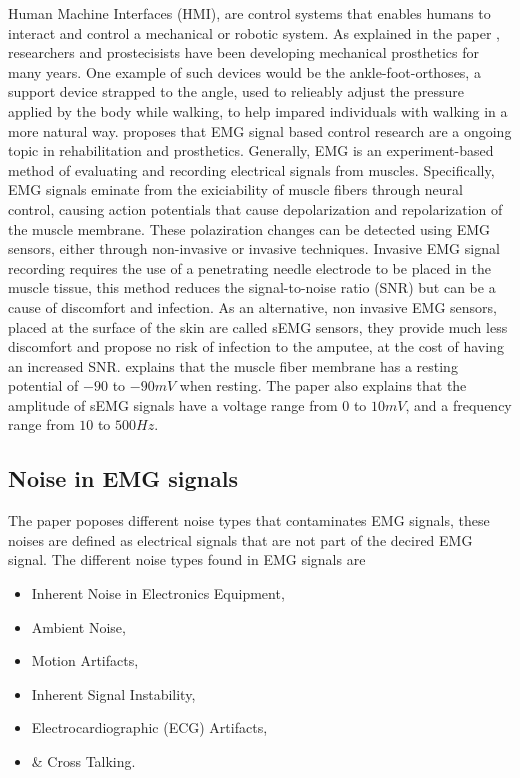 \documentclass[../main.tex]{subfiles}
\begin{document}
Human Machine Interfaces (HMI), are control systems that enables humans to interact and control a mechanical or robotic system.
As explained in the paper \cite{Tech2015}, researchers and prostecisists have been developing mechanical prosthetics for many years.
One example of such devices would be the ankle-foot-orthoses, a support device strapped to the angle, used to relieably adjust the pressure applied by the body while walking, to help impared individuals with walking in a more natural way.
\cite{Tech2015} proposes that EMG signal based control research are a ongoing topic in rehabilitation and prosthetics.
Generally, EMG is an experiment-based method of evaluating and recording electrical signals from muscles.
Specifically, EMG signals eminate from the exiciability of muscle fibers through neural control, causing action potentials that cause depolarization and repolarization of the muscle membrane.
These polaziration changes can be detected using EMG sensors, either through non-invasive or invasive techniques.
Invasive EMG signal recording requires the use of a penetrating needle electrode to be placed in the muscle tissue, this method reduces the signal-to-noise ratio (SNR) but can be a cause of discomfort and infection.
As an alternative, non invasive EMG sensors, placed at the surface of the skin are called sEMG sensors, they provide much less discomfort and propose no risk of infection to the amputee, at the cost of having an increased SNR. 
\cite{Tech2015} explains that the muscle fiber membrane has a resting potential of $-90$ to $-90 mV$ when resting. The paper also explains that the amplitude of sEMG signals have a voltage range from $0$ to $10 mV$, and a frequency range from $10$ to $500 Hz$.

\subsection{Noise in EMG signals}
\label{sec:noise}

The paper \cite{Tech2015} poposes different noise types that contaminates EMG signals, these noises are defined as electrical signals that are not part of the decired EMG signal.
The different noise types found in EMG signals are
\begin{itemize}
\item Inherent Noise in Electronics Equipment,
\item Ambient Noise,
\item Motion Artifacts,
\item Inherent Signal Instability,
\item Electrocardiographic (ECG) Artifacts,
\item \& Cross Talking.
\end{itemize}
\end{document}
